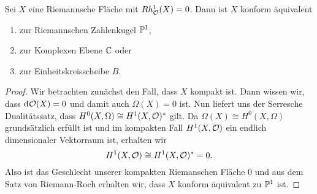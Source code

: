 \begin{thm}
  \label{thm:rmt}
  Sei $X$ eine Riemannsche Fläche mit $Rh_\hol^1(X) = 0$. Dann ist $X$
  konform äquivalent
  \begin{enumerate}
  \item zur Riemannschen Zahlenkugel $\P^1$,
  \item zur Komplexen Ebene $\C$ oder
  \item zur Einheitskreisscheibe $B$.
  \end{enumerate}
\end{thm}

\begin{proof}
  Wir betrachten zunächst den Fall,
  dass $X$ kompakt ist. Dann wissen wir, dass $\d
  \hol(X) = 0$ und damit auch $\Omega(X) = 0$ ist. Nun liefert uns der
  Serresche Dualitätssatz, dass $H^0(X, \Omega) \cong H^1(X,
  \hol)^\ast$ gilt. Da $\Omega(X) \cong H^0(X, \Omega)$ grundsätzlich
  erfüllt ist
  und im kompakten Fall $H^1(X, \hol)$ ein endlich dimensionaler
  Vektorraum ist, erhalten wir
  \[
  H^1(X, \hol) \cong H^1(X, \hol)^\ast = 0.
  \]
  Also ist das Geschlecht unserer kompakten Riemanschen Fläche 0 und
  aus dem Satz von Riemann-Roch erhalten wir, dass $X$ konform
  äquivalent zu $\P^1$ ist.


\end{proof}
